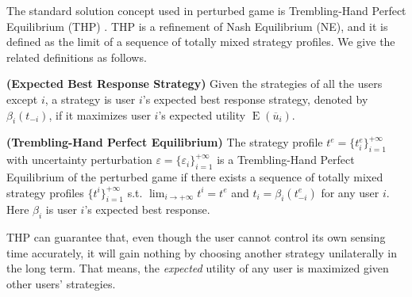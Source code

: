\documentclass{IEEEtran}
\begin{document}
The standard solution concept used in perturbed game is Trembling-Hand Perfect Equilibrium (THP) \cite{simon:thp_infinite}. THP is a refinement of Nash Equilibrium (NE), and it is defined as the limit of a sequence of totally mixed strategy profiles. We give the related definitions as follows.

{\color{black}
\begin{definition}
\label{def:best_response}
{\bf (Expected Best Response Strategy)} Given the strategies of all the users except $i$, a strategy is user $i$'s expected best response strategy, denoted by $\beta_i(t_{-i})$, if it maximizes user $i$'s expected utility $\operatorname{E}(\overline{u}_i)$.
\end{definition}
}

\begin{definition}
\label{def:thp}
{\bf (Trembling-Hand Perfect Equilibrium)} The strategy profile $t^{e}=\{t_i^{e}\}_{i=1}^{+\infty}$ with uncertainty perturbation $\varepsilon=\{\varepsilon_i\}_{i=1}^{+\infty}$ is a Trembling-Hand Perfect Equilibrium of the perturbed game if there exists a sequence of totally mixed strategy profiles $\{t^i\}_{i=1}^{+\infty}$ s.t. $\lim_{i\rightarrow +\infty}t^i = t^e$ and $t_i=\beta_i(t_{-i}^{e})$ for any user $i$. Here $\beta_i$ is user $i$'s expected best response.
\end{definition}

{\color{black}THP can guarantee that,} even though the user cannot control its own sensing time accurately, it will gain nothing by choosing another strategy unilaterally in the long term. That means, the \emph{expected} utility of any user is maximized given other users' strategies. %
\end{document}
